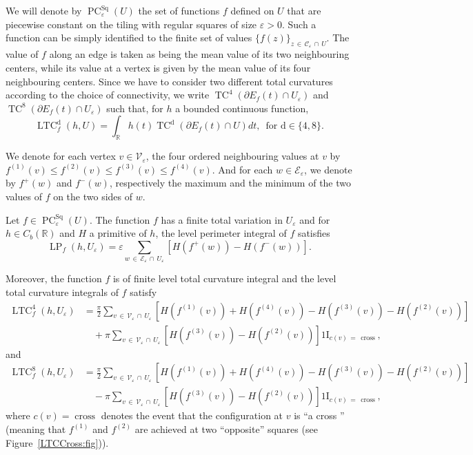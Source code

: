 \documentclass[10pt]{amsart}
\theoremstyle{definition}\newtheorem{defi}[theo]{Definition}\newtheorem{rema}[theo]{Remark}\newtheorem{exam}[theo]{Example}\newtheorem{exem}[theo]{Example}\newtheorem{nota}[theo]{Notation}
\newcommand{\R}{\mathbb{R}}
\newcommand{\ind}{{1\!\!\mathrm{I}}}
\newcommand{\eps}{\varepsilon}
\DeclareMathOperator{\TC}{TC}
\DeclareMathOperator{\LTC}{LTC}
\DeclareMathOperator{\LP}{LP}
\DeclareMathOperator{\PC}{PC}
\newcommand{\dd}{\mathrm{d}}
\DeclareMathOperator{\Sq}{Sq}
\DeclareMathOperator{\cross}{cross}
\newcommand{\calC}{\mathcal{C}}
\newcommand{\calV}{\mathcal{V}}
\newcommand{\calE}{\mathcal{E}}
\begin{document}

We will denote by $\PC^{\Sq}_\eps(U)$ the set of functions $f$ defined on $U$ that are piecewise constant on the tiling with regular squares of size $\eps>0$. Such a function can be simply identified to the finite set of values $\{f(z) \}_{z\,\in\,\calC_\eps\,\cap\,U}$. The value of $f$ along an edge is taken as being the mean value of its two neighbouring centers, while its value at a vertex is given by the mean value of its four neighbouring centers. Since we have to consider two different total curvatures according to the choice of connectivity, we write $\TC^4(\partial E_f(t) \cap U_\eps)$ and $\TC^8(\partial E_f(t)\cap U_\eps)$ such that, for $h$ a bounded continuous function,
\begin{equation}\label{TCsquare}
\LTC^\dd_f(h,U)=\int_{\R}h(t) \TC^\dd\left(\partial E_f(t)\cap U\right) dt,\,\text{ for } \dd\in\{4,8\}.
\end{equation}

We denote for each vertex $v\in {\calV}_\varepsilon$, the four ordered neighbouring values at $v$ by $f^{(1)}(v)\le f^{(2)}(v)\le f^{(3)}(v) \le f^{(4)}(v)$. And for each $w\in\calE_\eps$, we denote by $f^+(w)$ and $f^-(w)$, respectively the maximum and the minimum of the two values of $f$ on the two sides of $w$.


\begin{prop}\label{level-int-discr-square:prop}
Let $f\in\PC^{\Sq}_\eps(U)$. The function $f$ has a finite total variation in $U_\eps$ and for $h \in C_b(\R)$ and $H$ a primitive of $h$, the level perimeter integral of $f$ satisfies
\[
\LP_f(h,U_\eps)= \eps \sum_{w\,\in\,\calE_\eps\,\cap \,U_\eps} \left[H\left(f^+(w)\right) - H\left(f^-(w)\right)\right].
\]

Moreover, the function $f$ is of finite level total curvature integral and the level total curvature integrals of $f$ satisfy
\begin{align*}
\LTC^4_{f}(h,U_\eps) & = \frac{\pi}{2} \sum_{v\,\in\, \calV_\varepsilon\,\cap\,U_\eps} \left[H\left(f^{(1)}(v)\right) + H\left(f^{(4)}(v)\right)- H\left(f^{(3)}(v)\right) - H\left(f^{(2)}(v)\right)\right] \\
&\quad+ \pi \sum_{v\,\in\,\calV_\eps\,\cap\,U_\eps} \left[H\left(f^{(3)}(v)\right) - H\left(f^{(2)}(v)\right)\right]\ind_{c(v)\,=\,\cross},
\end{align*}
and
\begin{align*}
\LTC^8_{f}(h,U_\eps) & = \frac{\pi}{2} \sum_{v\,\in\, \calV_\varepsilon\,\cap\,U_\eps} \left[H\left(f^{(1)}(v)\right) + H\left(f^{(4)}(v)\right)- H\left(f^{(3)}(v)\right) - H\left(f^{(2)}(v)\right)\right] \\
&\quad - \pi
\sum_{v\,\in\,\calV_\eps\,\cap\,U_\eps} \left[H\left(f^{(3)}(v)\right) - H\left(f^{(2)}(v)\right)\right]
\ind_{c(v)\,=\,\cross},
\end{align*}
where $c(v)=\cross$ denotes the event that the configuration at $v$ is ``a cross '' (meaning that $f^{(1)}$ and $f^{(2)}$ are achieved at two ``opposite'' squares (see Figure~\ref{LTCCross:fig})).
\end{prop}
\end{document}

